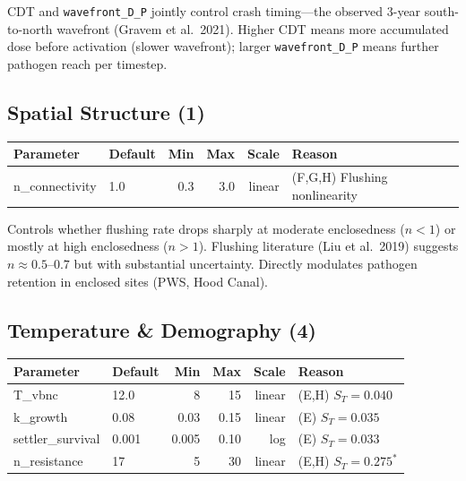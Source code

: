 \documentclass[11pt,a4paper]{article}
\begin{document}
\noindent CDT and \texttt{wavefront\_D\_P} jointly control crash timing---the observed 3-year south-to-north wavefront (Gravem et al.\ 2021). Higher CDT means more accumulated dose before activation (slower wavefront); larger \texttt{wavefront\_D\_P} means further pathogen reach per timestep.

\subsection{Spatial Structure (1)}

\begin{table}[H]
\centering
\begin{tabular}{llrrrl}
\toprule
\textbf{Parameter} & \textbf{Default} & \textbf{Min} & \textbf{Max} & \textbf{Scale} & \textbf{Reason} \\
\midrule
\textcolor{newparam}{n\_connectivity} & 1.0 & 0.3 & 3.0 & linear & (F,G,H) Flushing nonlinearity \\
\bottomrule
\end{tabular}
\end{table}

\noindent Controls whether flushing rate drops sharply at moderate enclosedness ($n < 1$) or mostly at high enclosedness ($n > 1$). Flushing literature (Liu et al.\ 2019) suggests $n \approx 0.5$--$0.7$ but with substantial uncertainty. Directly modulates pathogen retention in enclosed sites (PWS, Hood Canal).

\subsection{Temperature \& Demography (4)}

\begin{table}[H]
\centering
\begin{tabular}{llrrrl}
\toprule
\textbf{Parameter} & \textbf{Default} & \textbf{Min} & \textbf{Max} & \textbf{Scale} & \textbf{Reason} \\
\midrule
T\_vbnc & 12.0 & 8 & 15 & linear & (E,H) $S_T = 0.040$ \\
k\_growth & 0.08 & 0.03 & 0.15 & linear & (E) $S_T = 0.035$ \\
settler\_survival & 0.001 & 0.005 & 0.10 & log & (E) $S_T = 0.033$ \\
n\_resistance & 17 & 5 & 30 & linear & (E,H) $S_T = 0.275^*$ \\
\bottomrule
\end{tabular}
\end{table}
\end{document}
